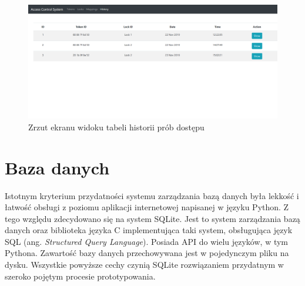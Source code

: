        \begin{figure}[]
            \centering
            \includegraphics[width=\textwidth, frame]{chapters/images/ss3.png}
            \caption{Zrzut ekranu widoku tabeli historii prób dostępu}
            \label{fig:ss3}
        \end{figure}

    \section{Baza danych}
    \label{s:db}

    	Istotnym kryterium przydatności systemu zarządzania bazą danych była lekkość i łatwość obsługi z poziomu aplikacji internetowej napisanej w języku Python. Z tego względu zdecydowano się na system SQLite. Jest to system zarządzania bazą danych oraz biblioteka języka C implementująca taki system, obsługująca język SQL (ang. \textit{Structured Query Language}). Posiada API do wielu języków, w tym Pythona. Zawartość bazy danych przechowywana jest w pojedynczym pliku na dysku. Wszystkie powyższe cechy czynią SQLite rozwiązaniem przydatnym w szeroko pojętym procesie prototypowania.
